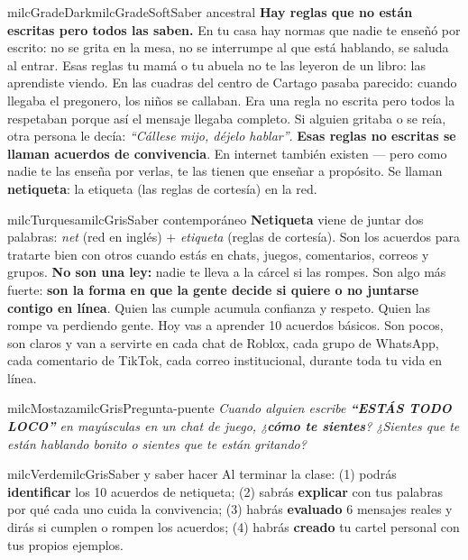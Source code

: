 \documentclass[11pt,letterpaper]{article}
\begin{document}
\begin{softbox}{milcGradeDark}{milcGradeSoft}{Saber ancestral}
\textbf{Hay reglas que no están escritas pero todos las saben.} En tu casa hay normas que nadie te enseñó por escrito: no se grita en la mesa, no se interrumpe al que está hablando, se saluda al entrar. Esas reglas tu mamá o tu abuela no te las leyeron de un libro: las aprendiste viendo. En las cuadras del centro de Cartago pasaba parecido: cuando llegaba el pregonero, los niños se callaban. Era una regla no escrita pero todos la respetaban porque así el mensaje llegaba completo. Si alguien gritaba o se reía, otra persona le decía: \emph{``Cállese mijo, déjelo hablar''}. \textbf{Esas reglas no escritas se llaman acuerdos de convivencia}. En internet también existen --- pero como nadie te las enseña por verlas, te las tienen que enseñar a propósito. Se llaman \textbf{netiqueta}: la etiqueta (las reglas de cortesía) en la red.
\end{softbox}

\begin{softbox}{milcTurquesa}{milcGris}{Saber contemporáneo}
\textbf{Netiqueta} viene de juntar dos palabras: \emph{net} (red en inglés) + \emph{etiqueta} (reglas de cortesía). Son los acuerdos para tratarte bien con otros cuando estás en chats, juegos, comentarios, correos y grupos. \textbf{No son una ley:} nadie te lleva a la cárcel si las rompes. Son algo más fuerte: \textbf{son la forma en que la gente decide si quiere o no juntarse contigo en línea}. Quien las cumple acumula confianza y respeto. Quien las rompe va perdiendo gente. Hoy vas a aprender 10 acuerdos básicos. Son pocos, son claros y van a servirte en cada chat de Roblox, cada grupo de WhatsApp, cada comentario de TikTok, cada correo institucional, durante toda tu vida en línea.
\end{softbox}

\begin{softbox}{milcMostaza}{milcGris}{Pregunta-puente}
\textit{Cuando alguien escribe \textbf{``ESTÁS TODO LOCO''} en mayúsculas en un chat de juego, ¿\textbf{cómo te sientes}? ¿Sientes que te están hablando bonito o sientes que te están gritando?}
\end{softbox}

\begin{softbox}{milcVerde}{milcGris}{Saber y saber hacer}
Al terminar la clase: (1) podrás \textbf{identificar} los 10 acuerdos de netiqueta; (2) sabrás \textbf{explicar} con tus palabras por qué cada uno cuida la convivencia; (3) habrás \textbf{evaluado} 6 mensajes reales y dirás si cumplen o rompen los acuerdos; (4) habrás \textbf{creado} tu cartel personal con tus propios ejemplos.
\end{softbox}
\end{document}
